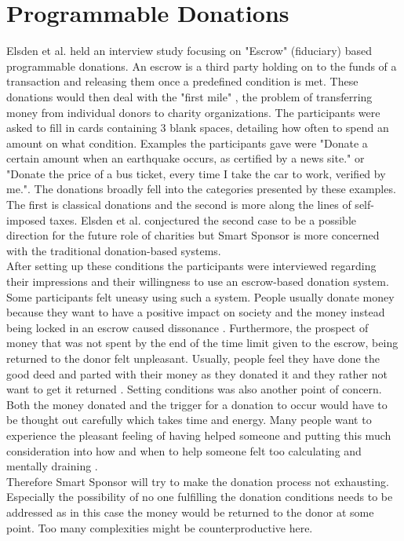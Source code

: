 \section*{Programmable Donations}
Elsden et al.\cite{progDon} held an interview study focusing on "Escrow" (fiduciary) based programmable donations. An escrow is a third party holding on to the funds of a transaction and releasing them once a predefined condition is met. These donations would then deal with the "first mile" \cite{progDon}, the problem of transferring money from individual donors to charity organizations. The participants were asked to fill in cards containing 3 blank spaces, detailing how often to spend an amount on what condition. Examples the participants gave were  "Donate a certain amount when an earthquake occurs, as certified by a news site." or "Donate the price of a bus ticket, every time I take the car to work, verified by me."\cite{progDon}.
The donations broadly fell into the categories presented by these examples. The first is classical donations and the second is more along the lines of self-imposed taxes. Elsden et al. conjectured the second case to be a possible direction for the future role of charities but Smart Sponsor is more concerned with the traditional donation-based systems.
\\
After setting up these conditions the participants were interviewed regarding their impressions and their willingness to use an escrow-based donation system. Some participants felt uneasy using such a system. People usually donate money because they want to have a positive impact on society and the money instead being locked in an escrow caused dissonance \cite{progDon}. Furthermore, the prospect of money that was not spent by the end of the time limit given to the escrow, being returned to the donor felt unpleasant. Usually, people feel they have done the good deed and parted with their money as they donated it and they rather not want to get it returned \cite{progDon}. Setting conditions was also another point of concern. Both the money donated and the trigger for a donation to occur would have to be thought out carefully which takes time and energy. Many people want to experience the pleasant feeling of having helped someone and putting this much consideration into how and when to help someone felt too calculating and mentally draining \cite{progDon}. \\
Therefore Smart Sponsor will try to make the donation process not exhausting. Especially the possibility of no one fulfilling the donation conditions needs to be addressed as in this case the money would be returned to the donor at some point. Too many complexities might be counterproductive here.
